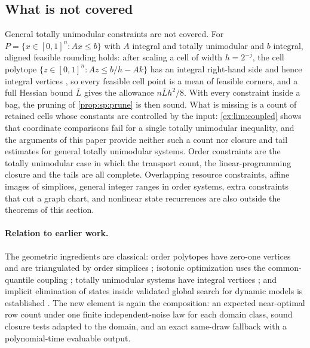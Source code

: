 \subsection{What is not covered}\label{sec:con:scope}

General totally unimodular constraints are not covered. For
$P=\{x\in[0,1]^n:Ax\le b\}$ with $A$ integral and totally unimodular and $b$
integral, aligned feasible rounding holds: after scaling a cell of width
$h=2^{-j}$, the cell polytope $\{z\in[0,1]^n:Az\le b/h-Ak\}$ has an integral
right-hand side and hence integral vertices
\citep{hoffman1956-integral-boundary-points-of-convex}, so every feasible cell point is a mean of feasible
corners, and a full Hessian bound $\bar L$ gives the allowance
$n\bar Lh^2/8$. With every constraint inside a bag, the pruning of
\cref{prop:sp:prune} is then sound. What is missing is a count of retained
cells whose constants are controlled by the input: \cref{ex:lim:coupled}
shows that coordinate comparisons fail for a single totally unimodular
inequality, and the arguments of this paper provide neither such a count
nor closure and tail estimates for general totally unimodular systems. Order
constraints are the totally unimodular case in which the transport count,
the linear-programming closure and the tails are all complete. Overlapping resource constraints, affine
images of simplices, general integer ranges in order systems, extra
constraints that cut a graph chart, and nonlinear state recurrences are also
outside the theorems of this section.

\paragraph{Relation to earlier work.} The geometric ingredients are
classical: order polytopes have zero-one vertices and are triangulated by
order simplices \citep{stanley1986-two-poset-polytopes}; isotonic optimization uses the
common-quantile coupling \citep{bach2018-efficient-algorithms-for-non-convex}; totally unimodular
systems have integral vertices \citep{hoffman1956-integral-boundary-points-of-convex}; and implicit
elimination of states inside validated global search for dynamic models is
established \citep{wilhelm2019-global-optimization-of-stiff-dynamical}. The new element is again the
composition: an expected near-optimal row count under one finite
independent-noise law for each domain class, sound closure tests adapted to
the domain, and an exact same-draw fallback with a polynomial-time
evaluable output.
